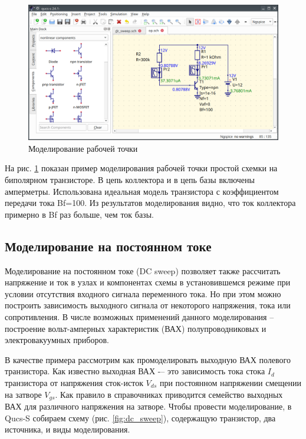 \documentclass[a4paper,12pt]{article}
\begin{document}
    \begin{figure}[!ht]
    \begin{center}
        \includegraphics[width=\textwidth]{img/dc_f8.png}
    \end{center}
    \caption{Моделирование рабочей точки} \label{fig:dc_f8}
    \end{figure}
    
На рис. \ref{fig:dc_f8} показан  пример моделирования рабочей точки простой схемки на биполярном транзисторе. В цепь коллектора и в цепь базы включены амперметры. Использована идеальная модель транзистора с коэффициентом передачи тока Bf=100.  Из результатов моделирования видно, что ток коллектора примерно в Bf раз больше, чем ток базы.

\subsection{Моделирование на постоянном токе}

Моделирование на постоянном токе (DC sweep) позволяет также рассчитать напряжение и ток в узлах и компонентах схемы в установившемся режиме при условии отсутствия входного сигнала переменного тока. Но при этом можно построить зависимость выходного сигнала от некоторого напряжения, тока или сопротивления. В числе возможных применений данного моделирования – построение вольт-амперных характеристик (ВАХ) полупроводниковых и электровакуумных приборов. 

В качестве примера рассмотрим как промоделировать выходную ВАХ полевого транзистора. Как известно выходная ВАХ -– это зависимость тока стока $I_d$ транзистора от напряжения сток-исток $V_{ds}$ при постоянном напряжении смещении на затворе $V_{gs}$. Как правило в справочниках приводится семейство выходных ВАХ для различного напряжения на затворе. Чтобы провести моделирование, в Qucs-S собираем схему (рис. \ref{fig:dc_sweep}), содержащую транзистор, два источника, и виды моделирования.
\end{document}
